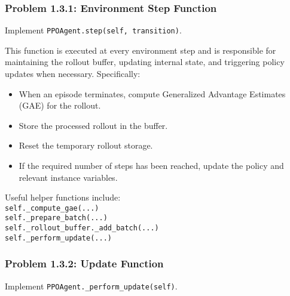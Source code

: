 \documentclass[12pt]{article}
\begin{document}
\subsubsection*{Problem 1.3.1: Environment Step Function}
Implement \texttt{PPOAgent.step(self, transition)}. 

This function is executed at every environment step and is responsible for maintaining the rollout buffer, updating internal state, and triggering policy updates when necessary. Specifically:
\begin{itemize}
    \item When an episode terminates, compute Generalized Advantage Estimates (GAE) for the rollout.
    \item Store the processed rollout in the buffer.
    \item Reset the temporary rollout storage.
    \item If the required number of steps has been reached, update the policy and relevant instance variables.
\end{itemize}

\noindent
Useful helper functions include: \\
\texttt{self.\_compute\_gae(...)} \\
\texttt{self.\_prepare\_batch(...)} \\
\texttt{self.\_rollout\_buffer.\_add\_batch(...)} \\
\texttt{self.\_perform\_update(...)}



\subsubsection*{Problem 1.3.2: Update Function}
Implement \texttt{PPOAgent.\_perform\_update(self)}. 
\end{document}

